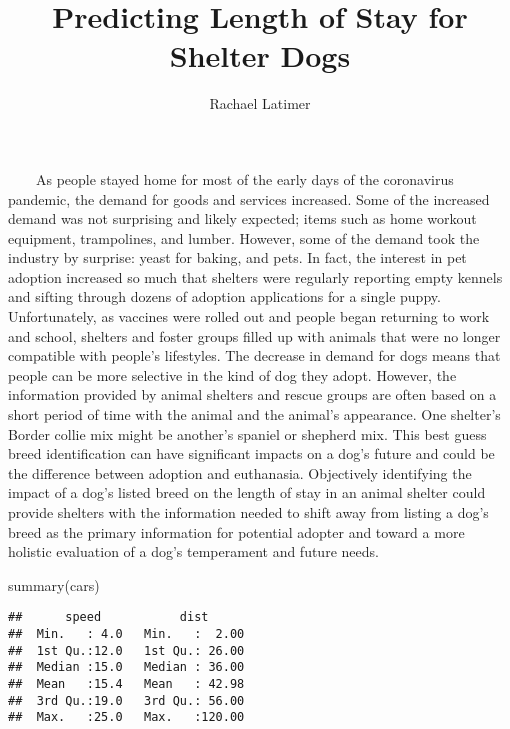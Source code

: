 \documentclass[
  11pt,
]{article}
\title{Predicting Length of Stay for Shelter Dogs}
\author{Rachael Latimer}
\date{}
\newenvironment{Shaded}{\begin{snugshade}}{\end{snugshade}}
\newcommand{\FunctionTok}[1]{\textcolor[rgb]{0.00,0.00,0.00}{#1}}
\newcommand{\NormalTok}[1]{#1}
\begin{document}
\maketitle

~~~~As people stayed home for most of the early days of the coronavirus
pandemic, the demand for goods and services increased. Some of the
increased demand was not surprising and likely expected; items such as
home workout equipment, trampolines, and lumber. However, some of the
demand took the industry by surprise: yeast for baking, and pets. In
fact, the interest in pet adoption increased so much that shelters were
regularly reporting empty kennels and sifting through dozens of adoption
applications for a single puppy.\\
\hspace*{0.333em}\hspace*{0.333em}\hspace*{0.333em}\hspace*{0.333em}Unfortunately,
as vaccines were rolled out and people began returning to work and
school, shelters and foster groups filled up with animals that were no
longer compatible with people's lifestyles. The decrease in demand for
dogs means that people can be more selective in the kind of dog they
adopt. However, the information provided by animal shelters and rescue
groups are often based on a short period of time with the animal and the
animal's appearance. One shelter's Border collie mix might be another's
spaniel or shepherd mix. This best guess breed identification can have
significant impacts on a dog's future and could be the difference
between adoption and euthanasia. Objectively identifying the impact of a
dog's listed breed on the length of stay in an animal shelter could
provide shelters with the information needed to shift away from listing
a dog's breed as the primary information for potential adopter and
toward a more holistic evaluation of a dog's temperament and future
needs.

\begin{Shaded}
\begin{Highlighting}[]
\FunctionTok{summary}\NormalTok{(cars)}
\end{Highlighting}
\end{Shaded}

\begin{verbatim}
##      speed           dist       
##  Min.   : 4.0   Min.   :  2.00  
##  1st Qu.:12.0   1st Qu.: 26.00  
##  Median :15.0   Median : 36.00  
##  Mean   :15.4   Mean   : 42.98  
##  3rd Qu.:19.0   3rd Qu.: 56.00  
##  Max.   :25.0   Max.   :120.00
\end{verbatim}
\end{document}
